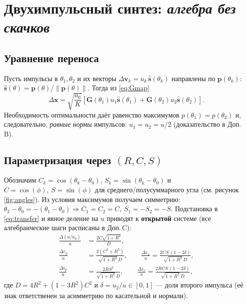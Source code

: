 \documentclass[12pt,a4paper]{article}
\newcommand{\vv}[1]{\bm{#1}}
\newcommand{\uv}[1]{\hat{\bm{#1}}}
\begin{document}
\section{Двухимпульсный синтез: \emph{алгебра без скачков}}

\subsection{Уравнение переноса}
Пусть импульсы в $\theta_1,\theta_2$ и их векторы $\Delta\vv v_k = u_k\,\uv s(\theta_k)$ направлены по $\vv p(\theta_k)$:
\(
\uv s(\theta)=\vv p(\theta)/\|\vv p(\theta)\|
\).
Тогда из \eqref{eq:Gmap}
\begin{equation}\label{eq:transfer}
\Delta\vv x = \sqrt{\frac{a_0}{K}}\left[\mathbf{G}(\theta_1)u_1\uv s(\theta_1) + \mathbf{G}(\theta_2)u_2\uv s(\theta_2)\right].
\end{equation}
Необходимость оптимальности даёт равенство максимумов $p(\theta_1)=p(\theta_2)$ и, следовательно, \emph{равные нормы} импульсов: $u_1=u_2=u/2$ (доказательство в Доп.\,B).

\subsection{Параметризация через $(R,C,S)$}
Обозначим $C_k=\cos(\theta_k-\theta_0)$, $S_k=\sin(\theta_k-\theta_0)$ и
\(
C=\cos(\phi),\ S=\sin(\phi)
\)
для среднего/полусуммарного угла (см. рисунок \ref{fig:angles}). Из условия максимумов получаем симметрию:
\(
\theta_2-\theta_0=-(\theta_1-\theta_0)\Rightarrow C_1=C_2=C,\ S_1=-S_2=-S
\).
Подстановка в \eqref{eq:transfer} и явное деление на $u$ приводят к \textbf{открытой} системе (все алгебраические шаги расписаны в Доп.\,C):
\begin{align}
\frac{\Delta (a/a_0)}{u} &= \frac{2C\sqrt{1+R^2}}{D},\label{eq:Da}\\
\frac{\Delta e_y}{u} &= \frac{2(C^2+R^2)}{\sqrt{1+R^2}\,D},\qquad
\frac{\Delta e_x}{u} = \frac{2CS\,(1-2\delta)}{\sqrt{1+R^2}\,D},\label{eq:De}\\
\frac{\Delta i_y}{u} &= \frac{2RS^2}{\sqrt{1+R^2}\,D},\qquad
\frac{\Delta i_x}{u} = \frac{2RCS\,(1-2\delta)}{\sqrt{1+R^2}\,D},\label{eq:Di}
\end{align}
где
\(
D=4R^2+(1-3R^2)C^2
\)
и
\(
\delta=u_2/u\in[0,1]
\)
--- доля второго импульса (её знак ответственен за асимметрию по касательной и нормали).
\end{document}

